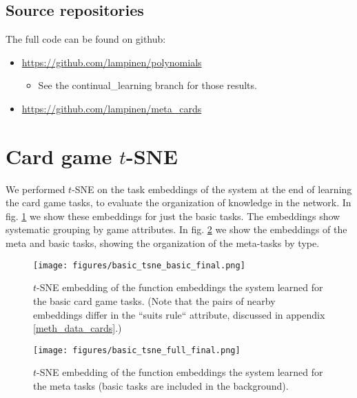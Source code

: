 \documentclass{article}
\begin{document}
\subsection{Source repositories}
The full code can be found on github:
\begin{itemize}
\item \url{https://github.com/lampinen/polynomials}
    \begin{itemize}
        \item See the continual\_learning branch for those results. 
    \end{itemize}
\item \url{https://github.com/lampinen/meta_cards} 
\end{itemize}
\section{Card game $t$-SNE} \label{app_cards_tsne}
We performed $t$-SNE \citep{LaurensvanderMaaten2008} on the task embeddings of the system at the end of learning the card game tasks, to evaluate the organization of knowledge in the network. In fig. \ref{fig_cards_tsne_basic} we show these embeddings for just the basic tasks. The embeddings show systematic grouping by game attributes. In fig. \ref{fig_cards_tsne_full} we show the embeddings of the meta and basic tasks, showing the organization of the meta-tasks by type. \par 
\begin{figure}[H]
\centering
\texttt{[image: figures/basic\_tsne\_basic\_final.png]}
\caption{$t$-SNE embedding of the function embeddings the system learned for the basic card game tasks. (Note that the pairs of nearby embeddings differ in the ``suits rule`` attribute, discussed in appendix \ref{meth_data_cards}.)} 
\label{fig_cards_tsne_basic}
\end{figure}%
\begin{figure}[H]
\centering
\texttt{[image: figures/basic\_tsne\_full\_final.png]}
\caption{$t$-SNE embedding of the function embeddings the system learned for the meta tasks (basic tasks are included in the background).} 
\label{fig_cards_tsne_full}
\end{figure}
\end{document}

